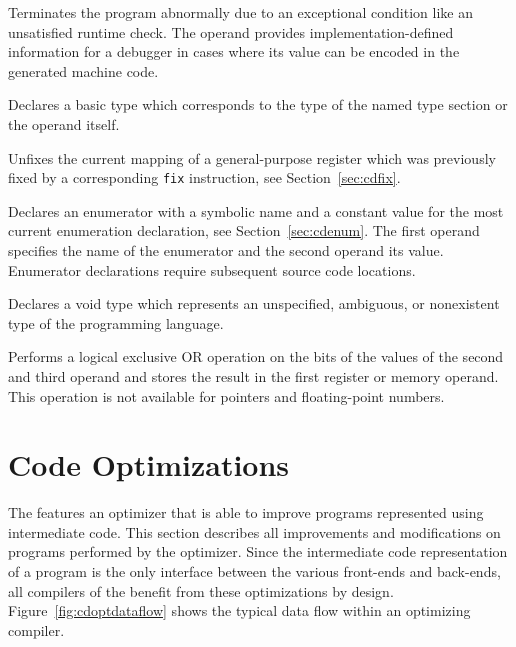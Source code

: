 
Terminates the program abnormally due to an exceptional condition like an unsatisfied runtime check.
The operand provides implementation-defined information for a debugger in cases where its value can be encoded in the generated machine code.


Declares a basic type which corresponds to the type of the named type section or the operand itself.


Unfixes the current mapping of a general-purpose register which was previously fixed by a corresponding \texttt{fix} instruction, see Section~\ref{sec:cdfix}.


Declares an enumerator with a symbolic name and a constant value for the most current enumeration declaration, see Section~\ref{sec:cdenum}.
The first operand specifies the name of the enumerator and the second operand its value.
Enumerator declarations require subsequent source code locations.


Declares a void type which represents an unspecified, ambiguous, or nonexistent type of the programming language.


Performs a logical exclusive OR operation on the bits of the values of the second and third operand and stores the result in the first register or memory operand.
This operation is not available for pointers and floating-point numbers.

\section{Code Optimizations}\label{sec:cdoptimizations}

The \ecs{} features an optimizer that is able to improve programs represented using intermediate code.
This section describes all improvements and modifications on programs performed by the optimizer.
Since the intermediate code representation of a program is the only interface between the various front-ends and back-ends,
all compilers of the \ecs{} benefit from these optimizations by design.
Figure~\ref{fig:cdoptdataflow} shows the typical data flow within an optimizing compiler.


